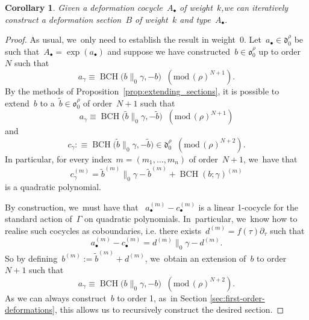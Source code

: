 \documentclass[JEP,XML,SOM,Unicode,published]{cedram}
\let\oldbullet\bullet
\renewcommand{\bullet}{{\scriptscriptstyle\oldbullet}}
\theoremstyle{plain}
\newtheorem{corollary}[theoremcounter]{Corollary}
\theoremstyle{definition}
\newcommand{\tx}{\text}
\newcommand{\nbd}{\nobreakdash-\hspace{0pt}}
\newcommand{\frakd}{\ensuremath{\mathfrak{d}}}
\newcommand{\frako}{\ensuremath{\mathfrak{o}}}
\renewcommand{\pmod}[1]{\;(\mathrm{mod}\, #1)}
\newcommand{\defequiv}{\mathrel{:\equiv}}
\let\Ga\Gamma
\let\ga\gamma
\DeclareMathOperator{\BCH}{BCH}
\begin{document}
\begin{corollary}
\label{cor:constructing-sections}
Given a deformation cocycle~$A_\bullet$ of weight~$k$,we can iteratively construct a deformation section~$B$ of weight~$k$ and type~$A_\bullet$.
\end{corollary}
\begin{proof}
As usual, we~only need to establish the result in weight~$0$. Let~$a_\bullet\in\frakd_0^\rho$ be such that~$A_\bullet=\exp(a_\bullet)$ and suppose we have constructed~$b\in\frako_0^\rho$ up to order~$N$ such that
\begin{equation*}
a_\ga \equiv \BCH\bigl(b\big\|_0\ga,-b\bigr) \;\pmod{(\rho)^{N+1}}
\tx{.}
\end{equation*}
By the methods of Proposition~\ref{prop:extending_sections}, it is possible to extend~$b$ to a~$\tilde{b}\in\frako_0^\rho$ of order~$N+1$ such that
\begin{equation*}
a_\ga \equiv \BCH\bigl(\tilde{b}\big\|_0\ga,-\tilde{b}\bigr) \;\pmod{(\rho)^{N+1}}
\end{equation*}
and
\begin{equation*}
c_\ga \defequiv \BCH\bigl(\tilde{b}\big\|_0\ga,-\tilde{b}\bigr) \in\frakd_0^\rho \;\pmod{(\rho)^{N+2}}
\tx{.}
\end{equation*}
In particular, for every index~$m=(m_1,\ldots,m_n)$ of order~$N+1$, we~have that
\begin{equation*}c_\ga^{(m)} = \tilde{b}^{(m)}\big\|_0\ga - \tilde{b}^{(m)} + \BCH(b;\ga)^{(m)}\end{equation*}
is a quadratic polynomial.

By construction, we~must have that ~$a_\bullet^{(m)}-c_\bullet^{(m)}$ is a linear 1\nbd{}cocycle for the standard action of~$\Ga$ on quadratic polynomials. In~particular, we~know how to realise such cocycles as coboundaries, i.e. there exists~$d^{(m)}=f(\tau)\partial_\tau$ such that
\begin{equation*}a_\bullet^{(m)}-c_\bullet^{(m)} = d^{(m)}\big\|_0\ga - d^{(m)}\tx{.}\end{equation*}
So by defining~$b^{(m)}:=\tilde{b}^{(m)} + d^{(m)}$, we~obtain an extension of~$b$ to order~$N+1$ such that
\begin{equation*}
a_\ga \equiv \BCH\bigl(b\big\|_0\ga,-b \bigr) \;\pmod{(\rho)^{N+2}}
\tx{.}
\end{equation*}
As we can always construct~$b$ to order 1, as~in Section \ref{sec:first-order-deformations}, this allows us to recursively construct the desired section.
\end{proof}
\end{document}

